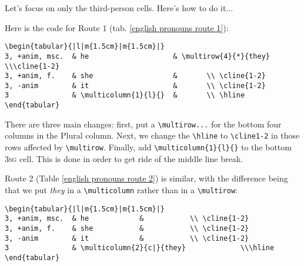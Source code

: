 \documentclass[11pt]{article}
\newcommand{\strt}{\noindent{$\bullet$} }
\begin{document}
\bigskip 

\strt Let's focus on only the third-person cells.  Here's how to do it...

\strt Here is the code for Route 1 (tab. \ref{english pronouns route 1}):

\bigskip 


\begin{verbatim}
\begin{tabular}{|l|m{1.5cm}|m{1.5cm}|}
3, +anim, msc.  & he                    & \multirow{4}{*}{they} \\\cline{1-2}
3, +anim, f.    & she                   &       \\ \cline{1-2}
3, -anim        & it                    &       \\ \cline{1-2}
3               & \multicolumn{1}{l}{}  &       \\ \hline
\end{tabular}
    \end{verbatim}

\bigskip

\strt There are three main changes: first, put a \texttt{\textbackslash multirow...} for the bottom four columns in the Plural column.  Next, we change the \texttt{\textbackslash hline} to \texttt{\textbackslash cline{1-2}} in those rows affected by \texttt{\textbackslash multirow}.  Finally, add \texttt{\textbackslash multicolumn\{1\}\{l\}\{\}} to the bottom \textsc{3sg} cell.  This is done in order to get ride of the middle line break.

\strt Route 2 (Table \ref{english pronouns route 2}) is similar, with the difference being that we put \textit{they} in a \texttt{\textbackslash multicolumn} rather than in a \texttt{\textbackslash multirow}:

    
\begin{verbatim}
\begin{tabular}{|l|m{1.5cm}|m{1.5cm}|}
3, +anim, msc.  & he            &           \\ \cline{1-2}
3, +anim, f.    & she           &           \\ \cline{1-2}
3, -anim        & it            &           \\ \cline{1-2}
3               & \multicolumn{2}{c|}{they}             \\\hline 
\end{tabular}
\end{verbatim}

\bigskip 
\end{document}

